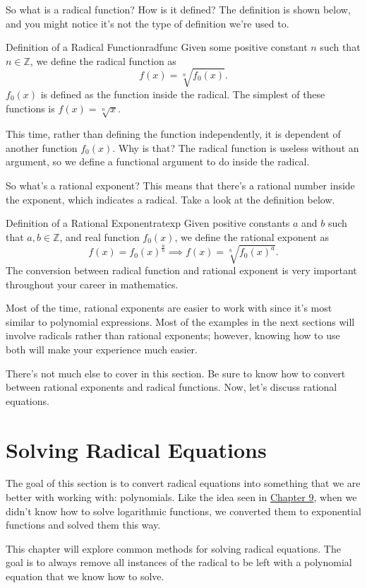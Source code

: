 \documentclass[lang=en,11pt]{elegantbook}
\begin{document}
So what is a radical function?  How is it defined? The definition is shown below, and you might notice it's not the type of definition we're used to.
\begin{definition}{Definition of a Radical Function}{radfunc}
Given some positive constant $n$ such that $n\in\mathbb{Z}$, we define the radical function as $$f(x)=\sqrt[n]{f_0(x)}.$$ $f_0(x)$ is defined as the function inside the radical. The simplest of these functions is $f(x)=\sqrt[n]{x}$.
\end{definition}
This time, rather than defining the function independently, it is dependent of another function $f_0(x)$.  Why is that? The radical function is useless without an argument, so we define a functional argument to do inside the radical.

So what's a rational exponent?  This means that there's a rational number inside the exponent, which indicates a radical.  Take a look at the definition below.

\begin{definition}{Definition of a Rational Exponent}{ratexp}
Given positive constants $a$ and $b$ such that $a,b\in\mathbb{Z}$, and real function $f_0(x)$, we define the rational exponent as $$f(x)=f_0(x)^{\frac{a}{b}} \implies f(x)=\sqrt[b]{f_0(x)^a}.$$ The conversion between radical function and rational exponent is very important throughout your career in mathematics.
\end{definition}
Most of the time, rational exponents are easier to work with since it's most similar to polynomial expressions. Most of the examples in the next sections will involve radicals rather than rational exponents; however, knowing how to use both will make your experience much easier.

There's not much else to cover in this section.  Be sure to know how to convert between rational exponents and radical functions.  Now, let's discuss rational equations.
\section{Solving Radical Equations}
\noindent The goal of this section is to convert radical equations into something that we are better with working with: polynomials.  Like the idea seen in \hyperlink{chapter.9}{Chapter 9}, when we didn't know how to solve logarithmic functions, we converted them to exponential functions and solved them this way.

This chapter will explore common methods for solving radical equations.  The goal is to always remove all instances of the radical to be left with a polynomial equation that we know how to solve.
\end{document}
